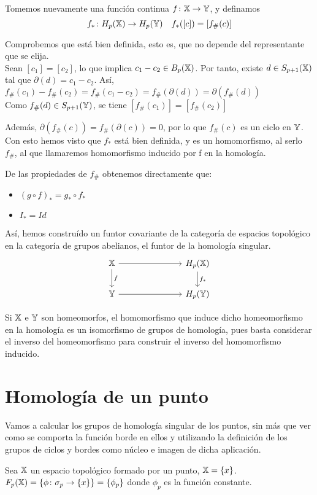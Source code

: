 Tomemos nuevamente una función continua $f \colon {\mathbb X} \to {\mathbb Y}$, y definamos
\[ f_* \colon H_p({\mathbb X}) \to H_p({\mathbb Y}) \quad f_*([c]) = [f_\#(c)]  \]

Comprobemos que está bien definida, esto es, que no depende del representante que se elija. \\
Sean $[c_1] = [c_2]$, lo que implica $c_1 - c_2 \in B_p({\mathbb X})$. Por tanto, existe $d \in S_{p+1}({\mathbb X})$ tal que $\partial(d) = c_1 - c_2.$
Así, $f_\#(c_1) - f_\#(c_2) = f_\#(c_1 - c_2) = f_\#(\partial(d)) = \partial(f_\#(d))$ \\
Como $f_\#(d) \in S_{p+1}({\mathbb Y})$, se tiene $[f_\#(c_1)] = [f_\#(c_2)]$

Además, $\partial(f_\#(c)) = f_\#(\partial(c)) = 0$, por lo que $f_\#(c)$ es un ciclo en ${\mathbb Y}$. Con esto hemos visto que $f_*$ está bien definida,
y es un homomorfismo, al serlo $f_\#$, al que llamaremos homomorfismo inducido por f en la homología.

De las propiedades de $f_\#$ obtenemos directamente que:
\begin{itemize}
  \item $(g \circ f)_* = g_* \circ f_*$
  \item $I_* = Id$
\end{itemize}

Así, hemos construído un funtor covariante de la categoría de espacios topológico en la categoría de grupos abelianos,
el funtor de la homología singular.
\[  \begin{tikzcd}
  \X \arrow{r} \arrow{d}{f} & [5em] H_p(\X) \arrow{d}{f_*} \\
  \Y \arrow{r}  & H_p(\Y)
\end{tikzcd} \]

Si ${\mathbb X}$ e ${\mathbb Y}$ son homeomorfos, el homomorfismo que induce dicho homeomorfismo en la homología es un isomorfismo de grupos de homología, pues
basta considerar el inverso del homeomorfismo para construir el inverso del homomorfismo inducido.

\section{Homología de un punto}

Vamos a calcular los grupos de homología singular de los puntos, sin más que ver como se comporta la función borde
en ellos y utilizando la definición de los grupos de ciclos y bordes como núcleo e imagen de dicha aplicación.

Sea ${\mathbb X}$ un espacio topológico formado por un punto, ${\mathbb X} = \{x\}$. \\
$F_{p}({\mathbb X}) = \{ \phi \colon \sigma_p \to \{x\} \} = \{\phi_p\}$ donde $\phi_p$ es la función constante.

